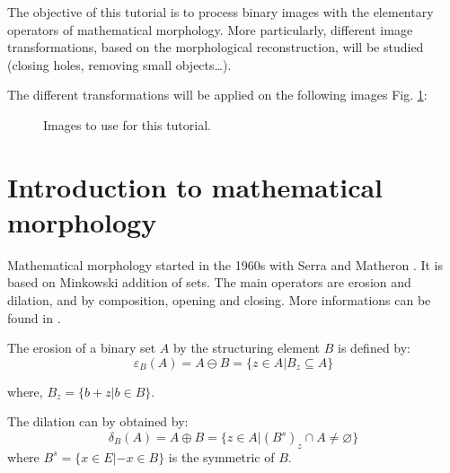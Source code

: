 \def\difficulty{1}
\label{tut:binarymorpho:enonce}

\begin{note}The objective of this tutorial is to process binary images with the elementary operators of mathematical morphology. More particularly, different image transformations, based on the morphological reconstruction, will be studied (closing holes, removing small objects\dots).\end{note}

The different transformations will be applied on the following images Fig. \ref{fig:morpho:images}:
\begin{figure}[htbp]
\centering\caption{Images to use for this tutorial.}
\hspace{.5cm}
\hspace{.5cm}
\hspace{.5cm}
%
 \label{fig:morpho:images}%
 \vspace*{-8pt}%
\end{figure}

\vspace*{-14pt}

\section{Introduction to mathematical mor\-pho\-lo\-gy}

Mathematical morphology started in the 1960s with Serra and Mathe\-ron \cite{Serra1982}. It is based on Minkowski addition of sets.  The main operators are erosion and dilation, and by composition, opening and closing. More informations can be found in \cite{Soille2003}.

The erosion of a binary set $A$ by the structuring element $B$ is defined by:
\begin{equation}\varepsilon_B (A)= A \ominus B = \{z\in A | B_{z} \subseteq A\}
\end{equation}

where, $B_z=\{b+z|b\in B\}$.

The dilation can by obtained by:
\begin{equation}\delta_B(A)=A  \oplus B = \{z \in A| (B^{s})_{z} \cap A\neq \varnothing\}\end{equation}
where $B^{s}=\{x\in E | -x \in B\}$ is the symmetric of $B$.


